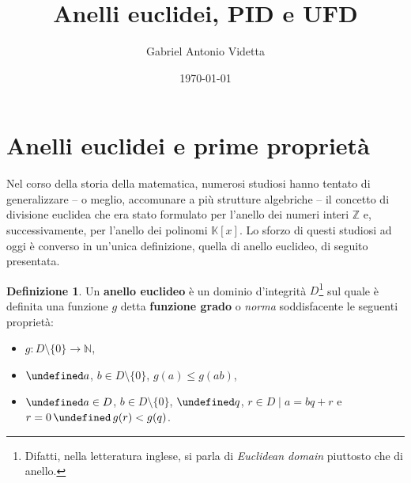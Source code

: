 \documentclass[a4paper]{article}
\title{Anelli euclidei, PID e UFD}
\author{Gabriel Antonio Videtta}
\date{\today}
\let\oldforall\forall
\let\forall\undefined
\DeclareMathOperator{\forall}{\oldforall}
\let\oldexists\exists
\let\exists\undefined
\DeclareMathOperator{\exists}{\oldexists}
\let\oldlor\lor
\let\lor\undefined
\DeclareMathOperator{\lor}{\oldlor}
\begin{document}
\maketitle

\newcommand{\nsg}{\mathrel{\unlhd}}

\newcommand{\BB}{\mathcal{B}}
\newcommand{\FF}{\mathbb{F}_2}
\newcommand{\NN}{\mathbb{N}}
\newcommand{\ZZ}{\mathbb{Z}}
\newcommand{\RR}{\mathbb{R}}
\newcommand{\KK}{\mathbb{K}}
\newcommand{\LL}[2]{\mathcal{L} \left(#1, \, #2\right)}

\newcommand{\MM}[2]{\mathcal{M}_{#1 \times #2}\left(\KK\right)}
\newcommand{\M}[1]{\mathcal{M}_{#1}\left(\KK\right)}
\newcommand{\Mbb}[3]{\mathcal{M}^{#1}_{#2} \left( #3 \right)}
\newcommand{\Mb}[2]{\mathcal{M}^{#1}_{#2}}

\theoremstyle{definition}
\newtheorem{definition}{Definizione}[section]

\renewcommand{\vec}[1]{\underline{#1}}

\newtheorem{example}{Esempio}[section]
\newtheorem{exercise}{Esercizio}[section]
\newtheorem{lemma}{Lemma}[section]
\newtheorem{theorem}{Teorema}[section]
\newtheorem{proposition}{Proposizione}[section]
\newtheorem{corollary}{Corollario}[section]
\newtheorem*{note}{Osservazione}

\tableofcontents

\section{Anelli euclidei e prime proprietà}

Nel corso della storia della matematica, numerosi studiosi hanno tentato
di generalizzare -- o meglio, accomunare a più strutture algebriche -- il
concetto di divisione euclidea che era stato formulato per l'anello
dei numeri interi $\ZZ$ e, successivamente, per l'anello dei polinomi
$\KK[x]$. Lo sforzo di questi studiosi ad oggi è converso in un'unica
definizione, quella di anello euclideo, di seguito presentata.

\begin{definition}
    Un \textbf{anello euclideo} è un dominio d'integrità $D$\footnote{Difatti, nella
        letteratura inglese, si parla di \textit{Euclidean domain} piuttosto che di
        anello.} sul quale è
    definita una funzione $g$ detta \textbf{funzione grado} o \textit{norma}
    soddisfacente le seguenti proprietà:

    \begin{itemize}
        \item $g : D \setminus \{0\} \to \NN$,
        \item $\forall a$, $b \in D \setminus \{0\}$, $g(a) \leq g(ab)$,
        \item $\forall a \in D$, $b \in D \setminus \{0\}$, $\exists q$, $r \in D \mid
                  a=bq+r$ e $r=0 \,\lor\, g(r)<g(q)$.
    \end{itemize}
\end{definition}
\end{document}

